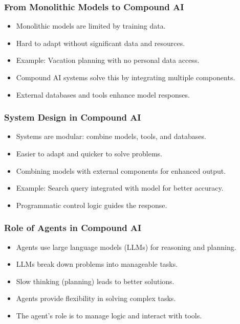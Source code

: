 \begin{frame}[fragile]\frametitle{From Monolithic Models to Compound AI}
    \begin{itemize}
        \item Monolithic models are limited by training data.
        \item Hard to adapt without significant data and resources.
        \item Example: Vacation planning with no personal data access.
        \item Compound AI systems solve this by integrating multiple components.
        \item External databases and tools enhance model responses.
    \end{itemize}
\end{frame}

\begin{frame}[fragile]\frametitle{System Design in Compound AI}
    \begin{itemize}
        \item Systems are modular: combine models, tools, and databases.
        \item Easier to adapt and quicker to solve problems.
        \item Combining models with external components for enhanced output.
        \item Example: Search query integrated with model for better accuracy.
        \item Programmatic control logic guides the response.
    \end{itemize}
\end{frame}

\begin{frame}[fragile]\frametitle{Role of Agents in Compound AI}
    \begin{itemize}
        \item Agents use large language models (LLMs) for reasoning and planning.
        \item LLMs break down problems into manageable tasks.
        \item Slow thinking (planning) leads to better solutions.
        \item Agents provide flexibility in solving complex tasks.
        \item The agent's role is to manage logic and interact with tools.
    \end{itemize}
\end{frame}

